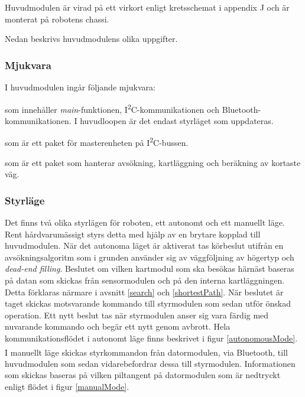 \documentclass[11pt]{article}
\begin{document}
\begin{flushleft}
Huvudmodulen är virad på ett virkort enligt kretsschemat i appendix J och är monterat på robotens chassi. 

Nedan beskrivs huvudmodulens olika uppgifter.

\subsubsection{Mjukvara}
I huvudmodulen ingår följande mjukvara:

\begin{description}[style=unboxed, leftmargin=0cm]
  \item[huvudMain.c] som innehåller \textit{main}-funktionen, I\textsuperscript{2}C-kommunikationen och Bluetooth\textsuperscript{\circledR}-kommunikationen. I huvudloopen är det endast styrläget som uppdateras.
  \item[I2C\_master.h] som är ett paket för masterenheten på I\textsuperscript{2}C-bussen.
  \item[searchPath.h] som är ett paket som hanterar avsökning, kartläggning och beräkning av kortaste väg.
\end{description}

\subsubsection{Styrläge}
Det finns två olika styrlägen för roboten, ett autonomt och ett manuellt läge. Rent hårdvarumässigt styrs detta med hjälp av en brytare kopplad till huvudmodulen. När det autonoma läget är aktiverat tas körbeslut utifrån en avsökningsalgoritm som i grunden använder sig av väggföljning av högertyp och \emph{dead-end filling}. Beslutet om vilken kartmodul som ska besökas härnäst baseras på datan som skickas från sensormodulen och på den interna kartläggningen. Detta förklaras närmare i avsnitt \ref{search} och \ref{shortestPath}. När beslutet är taget skickas motsvarande kommando till styrmodulen som sedan utför önskad operation. Ett nytt beslut tas när styrmodulen anser sig vara färdig med nuvarande kommando och begär ett nytt genom avbrott. Hela kommunikationsflödet i autonomt läge finns beskrivet i figur \ref{autonomousMode}. I manuellt läge skickas styrkommandon från datormodulen, via Bluetooth\textsuperscript{\circledR}, till huvudmodulen som sedan vidarebefordrar dessa till styrmodulen. Informationen som skickas baseras på vilken piltangent på datormodulen som är nedtryckt enligt flödet i figur \ref{manualMode}.


\end{flushleft}
\end{document}
